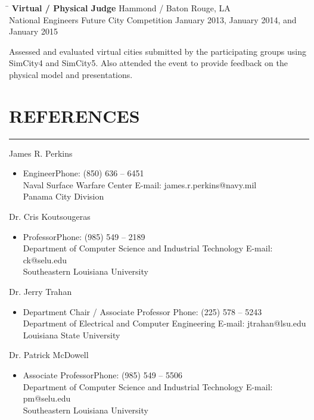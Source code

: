 \documentclass{res}
\begin{document}
\begin{resume}
	\begin{tabbing}
		\hspace{3.125in}\= \kill %
		{\bf Virtual / Physical Judge} \> \hspace{1in}Hammond / Baton Rouge, LA \\
		National Engineers Future City Competition \> January 2013, January 2014, and January 2015
	\end{tabbing}\vspace{-20pt}
	\vspace{8pt}Assessed and evaluated virtual cities submitted by the participating groups using SimCity4 and SimCity5. Also attended the event to provide feedback on the physical model and presentations.


\section{REFERENCES}
	\vspace{0.005in}	
	\rule{\textwidth}{0.5pt}
	James R. Perkins
	\begin{itemize}
		\item[] Engineer\hfill {Phone: (850) 636 – 6451}\\
		Naval Surface Warfare Center \hfill{E-mail: james.r.perkins@navy.mil}\\
		Panama City Division
	\end{itemize}
	
	Dr. Cris Koutsougeras
	\begin{itemize}
		\item[] Professor\hfill {Phone: (985) 549 – 2189}\\
		Department of Computer Science and Industrial Technology \hfill{E-mail: ck@selu.edu}\\
		Southeastern Louisiana University
	\end{itemize}
	
	Dr. Jerry Trahan
	\begin{itemize}
		\item[] Department Chair / Associate Professor \hfill {Phone: (225) 578 – 5243}\\
		Department of Electrical and Computer Engineering \hfill{E-mail: jtrahan@lsu.edu}\\
		Louisiana State University
	\end{itemize}

	Dr. Patrick McDowell
	\begin{itemize}
		\item[] Associate Professor\hfill {Phone: (985) 549 – 5506}\\
		Department of Computer Science and Industrial Technology \hfill{E-mail: pm@selu.edu}\\
		Southeastern Louisiana University
	\end{itemize}



\end{resume}
\end{document}
